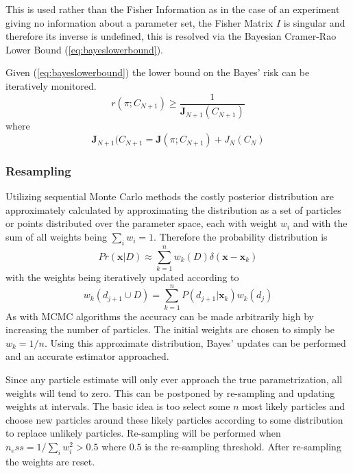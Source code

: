 This is used rather than the Fisher Information as in the case of an experiment giving no information about a parameter set, the Fisher Matrix $I$ is singular and therefore its inverse is undefined, this is resolved via the Bayesian Cramer-Rao Lower Bound (\ref{eq:bayeslowerbound}). 

Given (\ref{eq:bayeslowerbound}) the lower bound on the Bayes' risk can be iteratively monitored. 
\begin{equation}
r(\pi;C_{N+1})\geq \frac{1}{\mathbf{J}_{N+1}(C_{N+1})}
\end{equation}
where 
\begin{equation}
\mathbf{J}_{N+1}(C_{N+1} = \mathbf{J}(\pi;C_{N+1})+ J_N(C_N)
\label{eq:riskiteration}
\end{equation}
\subsubsection{Resampling}
\label{sec:resampling}
Utilizing sequential Monte Carlo methods the costly posterior distribution are approximately calculated by approximating the distribution as a set of particles or points distributed over the parameter space, each with weight $w_i$ and with the sum of all weights being $\sum \limits_i w_i = 1$. Therefore the probability distribution is 
\begin{equation*}
Pr(\mathbf{x}|D) \approx \sum \limits_{k=1}^n w_k(D)\delta(\mathbf{x}-\mathbf{x}_k)
\end{equation*}
with the weights being iteratively updated according to 
\begin{equation*}
w_k(d_{j+1} \cup D) = \sum \limits_{k=1}^n P(d_{j+1}|\mathbf{x}_k)w_k(d_j)
\end{equation*}
As with MCMC algorithms the accuracy can be made arbitrarily high by increasing the number of particles. The initial weights are chosen to simply be $w_k = 1/n$. Using this approximate distribution, Bayes' updates can be performed and an accurate estimator approached.

Since any particle estimate will only ever approach the true parametrization, all weights will tend to zero. This can be postponed by re-sampling and updating weights at intervals. The basic idea is too select some $n$ most likely particles and choose new particles around these likely particles according to some distribution to replace unlikely particles. Re-sampling will be performed when $n_ess = 1/\sum \limits_i w_i^2>0.5$ where $0.5$ is the re-sampling threshold. After re-sampling the weights are reset. 

